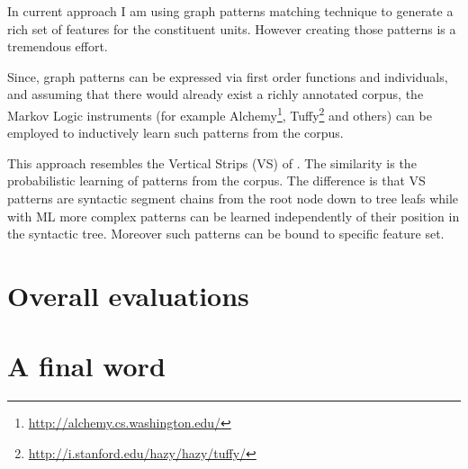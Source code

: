 In current approach I am using graph patterns matching technique to generate a rich set of features for the constituent units. However creating those patterns is a tremendous effort. 

Since, graph patterns can be expressed via first order functions and individuals, and assuming that there would already exist a richly annotated corpus, the Markov Logic instruments (for example Alchemy\footnote{\url{http://alchemy.cs.washington.edu/}}, Tuffy\footnote{\url{http://i.stanford.edu/hazy/hazy/tuffy/}} and others) can be employed to inductively learn such patterns from the corpus. 

This approach resembles the Vertical Strips (VS) of \citet{ODonoghue1991a}. The similarity is the probabilistic learning of patterns from the corpus. The difference is that VS patterns are syntactic segment chains from the root node down to tree leafs while with ML more complex patterns can be learned independently of their position in the syntactic tree. Moreover such patterns can be bound to specific feature set. 



%
%
%
\section{Overall evaluations}


\section{A final word}
